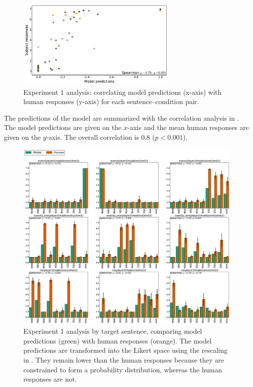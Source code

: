 \documentclass[leqno]{article}
\begin{document}

\begin{figure}[t]
  \centering
  \includegraphics[width=0.7\textwidth]{fig/experiment-scatterplot}
  \caption{Experiment 1 analysis: correlating model predictions
    (x-axis) with human responses (y-axis) for each
    sentence--condition pair.}
  \label{fig:exp1-corr}
\end{figure}

The predictions of the model are summarized with the correlation
analysis in . The model predictions are
given on the $x$-axis and the mean human responses are given
on the $y$-axis. The overall correlation is $0.8$ ($p < 0.001$).

\begin{figure}[t]
  \centering
  \includegraphics[width=1\textwidth]{fig/experiment-barplots}
  \caption{Experiment 1 analysis by target sentence, comparing model
    predictions (green) with human responses (orange).  The model
    predictions are transformed into the Likert space using the
    rescaling in . They remain lower than the human
    responses because they are constrained to form a probability
    distribution, whereas the human responses are not.}
  \label{fig:exp1-analysis}
\end{figure}
\end{document}
